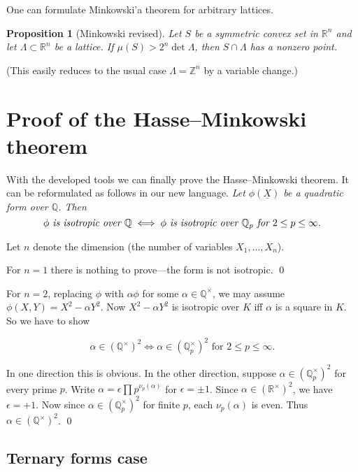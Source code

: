 \documentclass{article}
\newcommand{\ZZ}{\mathbb{Z}}
\newcommand{\QQ}{\mathbb{Q}}
\theoremstyle{myplain}
\newtheorem{proposition}{Proposition}[section]
\theoremstyle{mydefinition}
\begin{document}
One can formulate Minkowski'a theorem for arbitrary lattices.

\begin{proposition}[Minkowski revised]
  Let $S$ be a symmetric convex set in $\mathbb{R}^n$ and let
  $\Lambda \subset \mathbb{R}^n$ be a lattice. If $\mu (S) > 2^n \det \Lambda$,
  then $S \cap \Lambda$ has a nonzero point.
\end{proposition}

\noindent (This easily reduces to the usual case $\Lambda = \ZZ^n$ by a variable
change.)

\section{Proof of the Hasse--Minkowski theorem}

With the developed tools we can finally prove the Hasse--Minkowski theorem.
It can be reformulated as follows in our new language.
\emph{Let $\phi (\underline{X})$ be a quadratic form over $\QQ$. Then}
\[ \phi \text{\it{} is isotropic over }\QQ
  \iff
  \phi\text{\it{} is isotropic over }\QQ_p \text{\it{} for }2 \le p \le \infty. \]

Let $n$ denote the dimension (the number of variables $X_1,\ldots,X_n$).

\vspace{1em}

For $n = 1$ there is nothing to prove---the form is not isotropic. \qed

\vspace{1em}

For $n = 2$, replacing $\phi$ with $\alpha \phi$ for some $\alpha\in\QQ^\times$,
we may assume $\phi (X,Y) = X^2 - \alpha Y^2$. Now $X^2 - \alpha Y^2$ is
isotropic over $K$ iff $\alpha$ is a square in $K$. So we have to show

\[ \alpha \in (\QQ^\times)^2 \iff \alpha \in (\QQ_p^\times)^2 \text{ for }2 \le p \le \infty. \]

In one direction this is obvious. In the other direction, suppose
$\alpha \in (\QQ_p^\times)^2$ for every prime $p$. Write
$\alpha = \epsilon \prod p^{ \nu_p (\alpha)}$ for $\epsilon = \pm 1$. Since
$\alpha \in (\mathbb{R}^\times)^2$, we have $\epsilon = +1$. Now since
$\alpha \in (\QQ_p^\times)^2$ for finite $p$, each $ \nu_p (\alpha)$ is
even. Thus $\alpha \in (\QQ^\times)^2$. \qed

\subsection*{Ternary forms case}
\end{document}

